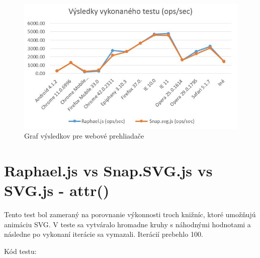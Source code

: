  \begin{figure}[H]
\centering
\includegraphics[width=0.9\linewidth]{obrazky/graf.JPG}
\caption{Graf výsledkov pre webové prehliadače}
\label{fig:graf}
\end{figure}



\section{Raphael.js vs Snap.SVG.js vs SVG.js - attr()}
Tento test bol zameraný na porovnanie výkonnosti troch knižníc, ktoré umožňujú animáciu SVG. V teste sa vytváralo hromadne kruhy s náhodnými hodnotami a následne po vykonaní iterácie sa vymazali. Iterácií prebehlo 100. 


Kód testu: 

